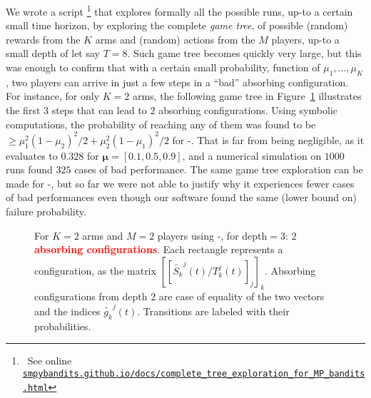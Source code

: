 We wrote a script
\footnote{~See online \texttt{\url{smpybandits.github.io/docs/complete_tree_exploration_for_MP_bandits.html}}}
that explores formally all the possible runs,
up-to a certain small time horizon,
by exploring the complete \emph{game tree},
of possible (random) rewards from the $K$ arms
and (random) actions from the $M$ players, up-to a small depth of let say $T=8$.
%
Such game tree becomes quickly very large, but this was enough to confirm that with
a certain small probability, function of $\mu_1,\dots,\mu_K$,
two players can arrive in just a few steps in a ``bad'' absorbing configuration.
%
For instance, for only $K=2$ arms, the following game tree in Figure~\ref{fig:5:oneGameTree_SelfishKLUCB} illustrates the first $3$ steps that can lead to $2$ absorbing configurations.
Using symbolic computations, the probability of reaching any of them was found to be
$\geq \mu_1^2(1-\mu_2)^2/2 + \mu_2^2(1-\mu_1)^2/2$ for \Selfish-\UCB.
That is far from being negligible, as it evaluates to $0.328$ for $\boldsymbol{\mu} = [0.1, 0.5, 0.9]$,
and a numerical simulation on $1000$ runs found $325$ cases of bad performance.
%
The same game tree exploration can be made for \Selfish-\klUCB,
but so far we were not able to justify why it experiences fewer cases of bad performances even though our software found the same (lower bound on) failure probability.


\begin{figure}[h!]
    \centering
    
    \caption[Trajectories of $M=2$ players using \Selfish-\UCB{} for $K=2$ arms.]{For $K=2$ arms and $M=2$ players using \Selfish-\UCB, for depth$=3$: $2$ \textbf{\textcolor{red}{absorbing configurations}}. Each rectangle represents a configuration, as the matrix $[[\widetilde{S_k}^j(t) / T_k^j(t) ]_j]_k$. Absorbing configurations from depth $2$ are case of equality of the two vectors and the \Selfish{} indices $\widetilde{g_k}^j(t)$. Transitions are labeled with their probabilities.}
    \label{fig:5:oneGameTree_SelfishKLUCB}
\end{figure}


